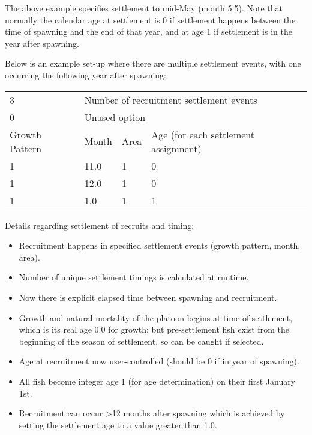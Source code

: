 The above example specifies settlement to mid-May (month 5.5). Note that normally the calendar age at settlement is 0 if settlement happens between the time of spawning and the end of that year, and at age 1 if settlement is in the year after spawning. 

Below is an example set-up where there are multiple settlement events, with one occurring the following year after spawning: 
\begin{center}
	\begin{tabular}{p{3cm} p{2cm} p{2cm} p{7cm}}
		\hline
		3 & \multicolumn{3}{l}{Number of recruitment settlement events}\Tstrut\\
		0 & \multicolumn{3}{l}{Unused option}\Bstrut\\
		\hline
		Growth Pattern & Month & Area & Age (for each settlement assignment)\Tstrut\Bstrut\\
		\hline
		1 & 11.0 & 1 & 0 \Tstrut\\
		1 & 12.0 & 1 & 0 \\
		1 & 1.0  & 1 & 1 \Bstrut\\
		\hline
	\end{tabular}		
\end{center}

Details regarding settlement of recruits and  timing:
	\begin{itemize}
		\item Recruitment happens in specified settlement events (growth pattern, month, area).
		\item Number of unique settlement timings is calculated at runtime.
		\item Now there is explicit elapsed time between spawning and recruitment.
		\item Growth and natural mortality of the platoon begins at time of settlement, which is its real age 0.0 for growth; but pre-settlement fish exist from the beginning of the season of settlement, so can be caught if selected.
		\item Age at recruitment now user-controlled (should be 0 if in year of spawning).
		\item All fish become integer age 1 (for age determination) on their first January 1st.
		\item Recruitment can occur >12 months after spawning which is achieved by setting the settlement age to a value greater than 1.0.		
	\end{itemize}

